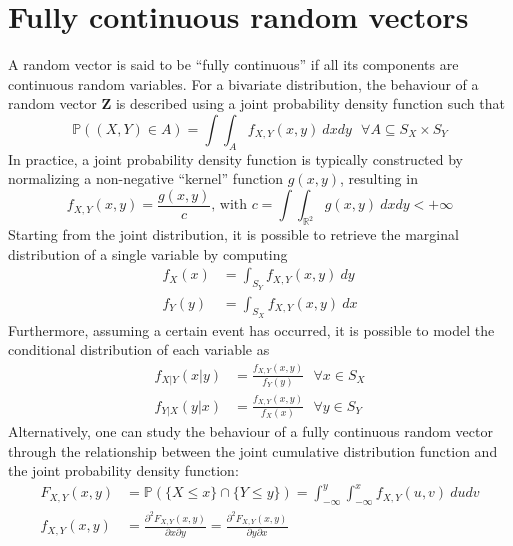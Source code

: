\documentclass{report}
\begin{document}
\section{Fully continuous random vectors}
A random vector is said to be ``fully continuous'' if all its components are continuous random variables. \newline
For a bivariate distribution, the behaviour of a random vector $\displaystyle \mathbf{Z}$ is described using a joint probability density function such that
\[\mathbb{P}((X, Y) \in A) = \int\int_A f_{X, Y}(x, y) \ dxdy \text{ } \forall A \subseteq S_X \times S_Y\]
In practice, a joint probability density function is typically constructed by normalizing a non-negative ``kernel'' function $\displaystyle g(x, y)$, resulting in
\[f_{X, Y}(x, y) = \frac{g(x, y)}{c} \text{, with } c = \int\int_{\mathbb{R}^2} g(x, y) \ dxdy < +\infty\]
Starting from the joint distribution, it is possible to retrieve the marginal distribution of a single variable by computing
\begin{align*}
    f_X(x) &= \int_{S_Y} f_{X, Y}(x, y) \ dy \\
    f_Y(y) &= \int_{S_X} f_{X, Y}(x, y) \ dx
\end{align*}
Furthermore, assuming a certain event has occurred, it is possible to model the conditional distribution of each variable as
\begin{align*}
    f_{X|Y}(x|y) &= \frac{f_{X, Y}(x, y)}{f_Y(y)} \text{ } \forall x \in S_X \\
    f_{Y|X}(y|x) &= \frac{f_{X, Y}(x, y)}{f_X(x)} \text{ } \forall y \in S_Y
\end{align*}
Alternatively, one can study the behaviour of a fully continuous random vector through the relationship between the joint cumulative distribution function and the joint probability density function:
\begin{align*}
    F_{X, Y}(x, y) &= \mathbb{P}(\{X \leq x\} \cap \{Y \leq y\}) = \int_{-\infty}^y\int_{-\infty}^x f_{X, Y}(u, v) \ dudv \\
    f_{X, Y}(x, y) &= \frac{\partial^2F_{X, Y}(x, y)}{\partial x \partial y} = \frac{\partial^2F_{X, Y}(x, y)}{\partial y \partial x}
\end{align*}
\end{document}
